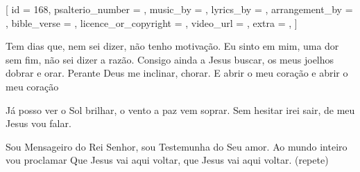 
[
    id                     = {168},
    psalterio_number       = {},
    music_by               = {},
    lyrics_by              = {},
    arrangement_by         = {},
    bible_verse            = {},
    licence_or_copyright   = {},
    video_url              = {},
    extra                  = {},
]


\beginverse

Tem dias que, nem sei dizer, não tenho motivação. 
Eu sinto em mim, uma dor sem fim, não sei dizer a razão. 
Consigo ainda a Jesus buscar,  os meus joelhos dobrar e orar. 
Perante Deus me inclinar, chorar. 
E abrir o meu coração e abrir o meu coração

\endverse


\beginchorus

Já posso ver o Sol brilhar, o vento a paz vem soprar. 
Sem hesitar irei sair, de meu Jesus vou falar. 

\endchorus


\beginverse

Sou Mensageiro do Rei Senhor, sou Testemunha do Seu amor. 
Ao mundo inteiro vou proclamar
Que Jesus vai aqui voltar, que Jesus vai aqui voltar. (repete)

\endverse



\endsong
